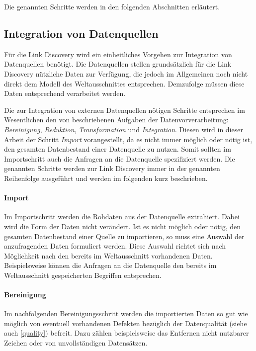 Die genannten Schritte werden in den folgenden Abschnitten erläutert.

\subsection{Integration von Datenquellen}
\label{integration_generic}

Für die Link Discovery wird ein einheitliches Vorgehen zur Integration von Datenquellen benötigt. Die Datenquellen stellen grundsätzlich für die Link Discovery nützliche Daten zur Verfügung, die jedoch im Allgemeinen noch nicht direkt dem Modell des Weltausschnittes entsprechen. Demzufolge müssen diese Daten entsprechend verarbeitet werden.

Die zur Integration von externen Datenquellen nötigen Schritte entsprechen im Wesentlichen den von \textcite[S. 48f.]{hkp2012} beschriebenen Aufgaben der Datenvorverarbeitung: \emph{Bereinigung}, \emph{Reduktion}, \emph{Transformation} und \emph{Integration}. Diesen wird in dieser Arbeit der Schritt \emph{Import} vorangestellt, da es nicht immer möglich oder nötig ist, den gesamten Datenbestand einer Datenquelle zu nutzen. Somit sollten im Importschritt auch die Anfragen an die Datenquelle spezifiziert werden. Die genannten Schritte werden zur Link Discovery immer in der genannten Reihenfolge ausgeführt und werden im folgenden kurz beschrieben.

\paragraph{Import}

Im Importschritt werden die Rohdaten aus der Datenquelle extrahiert. Dabei wird die Form der Daten nicht verändert. Ist es nicht möglich oder nötig, den gesamten Datenbestand einer Quelle zu importieren, so muss eine Auswahl der anzufragenden Daten formuliert werden. Diese Auswahl richtet sich nach Möglichkeit nach den bereits im Weltausschnitt vorhandenen Daten. Beispielsweise können die Anfragen an die Datenquelle den bereits im Weltausschnitt gespeicherten Begriffen entsprechen.

\paragraph{Bereinigung}

Im nachfolgenden Bereinigungsschritt werden die importierten Daten so gut wie möglich von eventuell vorhandenen Defekten bezüglich der Datenqualität (siehe auch \cref{quality}) befreit. Dazu zählen beispielsweise das Entfernen nicht nutzbarer Zeichen oder von unvollständigen Datensätzen.

